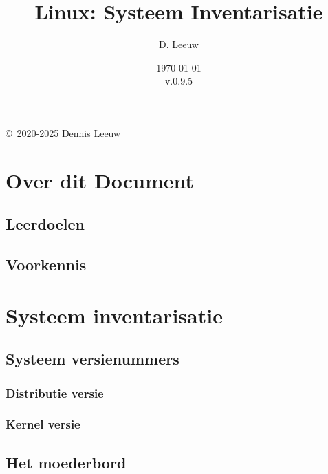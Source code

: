\documentclass[a4paper,12pt,twoside,openright,titlepage]{book}
\author{D. Leeuw}
\title{Linux: Systeem Inventarisatie}
\date{\today\\v.0.9.5}
\begin{document}

\maketitle

\copyright\ 2020-2025 Dennis Leeuw\\




\frontmatter
\chapter{Over dit Document}
\section{Leerdoelen}

\section{Voorkennis}


\tableofcontents

\mainmatter


\chapter{Systeem inventarisatie}


\section{Systeem versienummers}

\subsection{Distributie versie}

\subsection{Kernel versie}


\section{Het moederbord}
\end{document}
